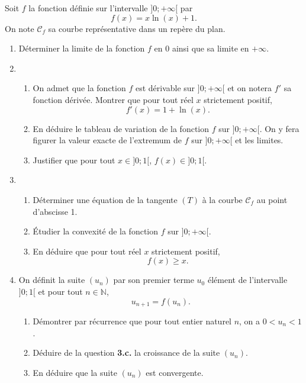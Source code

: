 \documentclass[11pt,fleqn, openany]{book} %
\begin{document}
\begin{exercise}[subtitle={(Centres étrangers 2022)}]
Soit $f$ la fonction définie sur l'intervalle $]0;+\infty[$ par
\[f(x)=x\ln(x)+1.\]
On note $\mathcal{C}_f$ sa courbe représentative dans un repère du plan.
\begin{enumerate}
\item Déterminer la limite de la fonction $f$ en 0 ainsi que sa limite en $+\infty$.
\item \begin{enumerate}
\item On admet que la fonction $f$ est dérivable sur $]0;+\infty[$ et on notera $f'$ sa fonction dérivée. Montrer que pour tout réel $x$ strictement positif,
\[f'(x)=1+\ln(x).\]
\item En déduire le tableau de variation de la fonction $f$ sur $]0;+\infty[$. On y fera figurer la valeur exacte de l'extremum de $f$ sur $]0;+\infty[$ et les limites.
\item Justifier que pour tout $x\in]0;1[$, $f(x)\in]0;1[$.
\end{enumerate}
\item \begin{enumerate} 
\item Déterminer une équation de la tangente $(T)$ à la courbe $\mathcal{C}_f$ au point d'abscisse 1.
\item Étudier la convexité de la fonction $f$ sur $]0;+\infty[$.
\item En déduire que pour tout réel $x$ strictement positif,
\[f(x)\geqslant x.\]\end{enumerate}
\item On définit la suite $(u_n)$ par son premier terme $u_0$ élément de l'intervalle $]0;1[$ et pour tout $n\in\mathbb{N}$,
\[u_{n+1}=f(u_n).\]
\begin{enumerate}
\item Démontrer par récurrence que pour tout entier naturel $n$, on a $0<u_n<1$.
\item Déduire de la question \textbf{3.c.} la croissance de la suite $(u_n)$.
\item En déduire que la suite $(u_n)$ est convergente.
\end{enumerate}
\end{enumerate}
\newpage
\end{exercise}
\end{document}
